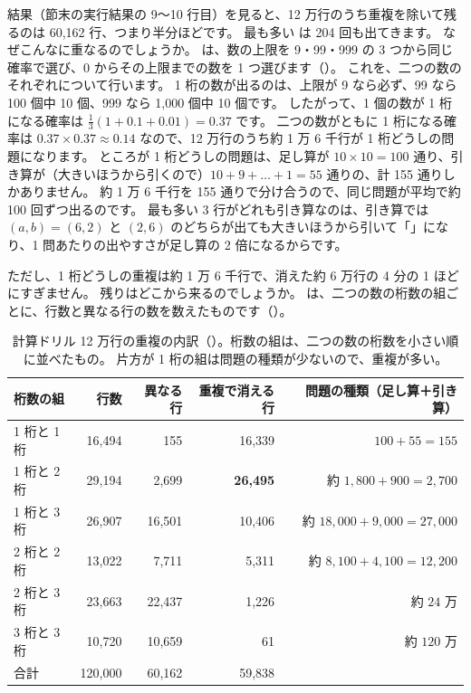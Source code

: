 結果（節末の実行結果の 9〜10 行目）を見ると、12 万行のうち重複を除いて残るのは 60,162 行、つまり半分ほどです。
最も多い  は 204 回も出てきます。
なぜこんなに重なるのでしょうか。
 は、数の上限を 9・99・999 の 3 つから同じ確率で選び、0 からその上限までの数を 1 つ選びます（）。
これを、二つの数のそれぞれについて行います。
1 桁の数が出るのは、上限が 9 なら必ず、99 なら 100 個中 10 個、999 なら 1,000 個中 10 個です。
したがって、1 個の数が 1 桁になる確率は $\frac{1}{3}(1+0.1+0.01)=0.37$ です。
二つの数がともに 1 桁になる確率は $0.37\times0.37\approx0.14$ なので、12 万行のうち約 1 万 6 千行が 1 桁どうしの問題になります。
ところが 1 桁どうしの問題は、足し算が $10\times10=100$ 通り、引き算が（大きいほうから引くので）$10+9+\dots+1=55$ 通りの、計 155 通りしかありません。
約 1 万 6 千行を 155 通りで分け合うので、同じ問題が平均で約 100 回ずつ出るのです。
最も多い 3 行がどれも引き算なのは、引き算では $(a,b)=(6,2)$ と $(2,6)$ のどちらが出ても大きいほうから引いて「」になり、1 問あたりの出やすさが足し算の 2 倍になるからです。

ただし、1 桁どうしの重複は約 1 万 6 千行で、消えた約 6 万行の 4 分の 1 ほどにすぎません。
残りはどこから来るのでしょうか。
は、二つの数の桁数の組ごとに、行数と異なる行の数を数えたものです（）。

\begin{table}[tbp]
\centering
\caption{計算ドリル 12 万行の重複の内訳（）。桁数の組は、二つの数の桁数を小さい順に並べたもの。
片方が 1 桁の組は問題の種類が少ないので、重複が多い。}
\label{tab:pt-dedup-digits}
\footnotesize
\begin{tabular}{lrrrr}
\toprule
桁数の組 & 行数 & 異なる行 & 重複で消える行 & 問題の種類（足し算＋引き算） \\
\midrule
1 桁と 1 桁 & 16,494 & 155 & 16,339 & $100+55=155$ \\
1 桁と 2 桁 & 29,194 & 2,699 & \textbf{26,495} & 約 $1{,}800+900=2{,}700$ \\
1 桁と 3 桁 & 26,907 & 16,501 & 10,406 & 約 $18{,}000+9{,}000=27{,}000$ \\
2 桁と 2 桁 & 13,022 & 7,711 & 5,311 & 約 $8{,}100+4{,}100=12{,}200$ \\
2 桁と 3 桁 & 23,663 & 22,437 & 1,226 & 約 $24$ 万 \\
3 桁と 3 桁 & 10,720 & 10,659 & 61 & 約 $120$ 万 \\
\midrule
合計 & 120,000 & 60,162 & 59,838 & \\
\bottomrule
\end{tabular}
\end{table}

